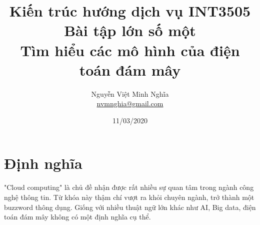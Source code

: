 \documentclass{article}
\author{Nguyễn Việt Minh Nghĩa \\ \href{mailto:nvmnghia@gmail.com}{nvmnghia@gmail.com}}
\date{11/03/2020}
\title{Kiến trúc hướng dịch vụ INT3505\\Bài tập lớn số một\\Tìm hiểu các mô hình của điện toán đám mây}
\begin{document}
\maketitle

\section{Định nghĩa}

"Cloud computing" là chủ đề nhận được rất nhiều sự quan tâm trong ngành công nghệ
thông tin. Từ khóa này thậm chí vượt ra khỏi chuyên ngành, trở thành một buzzword
thông dụng. Giống với nhiều thuật ngữ lớn khác như AI, Big data, điện toán đám mây
không có một định nghĩa cụ thể.



\printbibliography
\end{document}
